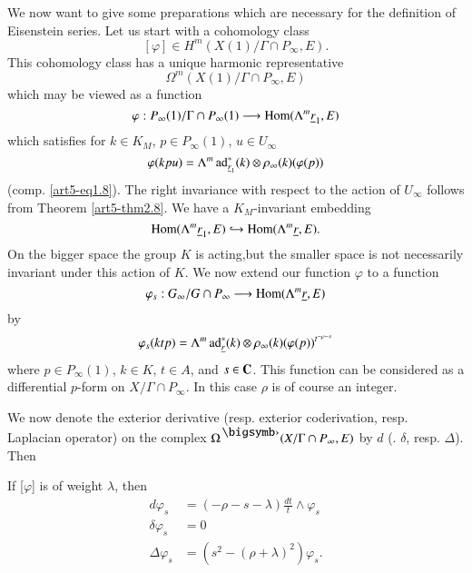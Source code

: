 We now want to give some preparations which are necessary for the definition of Eisenstein series. Let us start with a cohomology class
$$
[\varphi] \in H^m (X(1)/ \Gamma \cap P_\infty, E). 
$$
This cohomology class has a unique harmonic representative 
$$
\Omega^m (X(1) / \Gamma \cap P_\infty, E)
$$
 which may be viewed as a function
$$
\varphi : P_\infty (1)/ \Gamma \cap P_\infty (1) \longrightarrow \operatorname{Hom} (\Lambda^m \underline{r}_1, E)
$$
which satisfies for $k \in K_M$, $p \in P_\infty (1)$, $u \in U_\infty$
$$
\varphi (k p u) = \Lambda^m \operatorname{ad}^\ast_{\underline{r}_1} (k) \otimes \rho_\infty (k) (\varphi (p))
$$
(comp. \eqref{art5-eq1.8}). The right invariance with respect to the action of $U_\infty$ follows from Theorem \eqref{art5-thm2.8}. We have a $K_M$-invariant embedding 
$$
\operatorname{Hom} (\Lambda^m \underline{r}_1, E) \hookrightarrow \operatorname{Hom} (\Lambda^m\underline{r}, E).
$$
On the bigger space the group $K$ is acting,\pageoriginale but the smaller space is not necessarily invariant under this action of $K$. We now extend our function $\varphi$ to a function
$$
\varphi_s : G_\infty / G \cap P_\infty \longrightarrow \operatorname{Hom} (\Lambda^m\underline{r}, E)
$$
by
$$
\varphi_s (ktp) = \Lambda^m \operatorname{ad}^\ast_{\underline{r}} (k) \otimes \rho_\infty  (k) (\varphi (p))^{t^{-\rho -s}}
$$
where $p \in P_{\infty} (1)$, $k \in K$, $t \in A$, and $s \in \mathbf{C}$. This function can be considered as a differential $p$-form on $X/ \Gamma  \cap P_\infty$. In this case $\rho$ is of course an integer.

We now denote the exterior derivative (resp. exterior coderivation, resp. Laplacian operator) on the complex $\Omega^\bigdot (X/ \Gamma \cap P_\infty, E)$ by $d$ (\resp. $\delta$, resp. $\Delta$). Then 

\setcounter{equation}{0}
\begin{lemma}\label{art5-lem3.1}
If [$\varphi$] is of weight $\lambda$, then 
\begin{align*}
d \varphi_s & = (- \rho - s - \lambda) \frac{dt}{t} \wedge \varphi_s \\
\delta \varphi_s & = 0 \\
\Delta \varphi_s & = (s^2 - (\rho + \lambda)^2)\varphi_s.
\end{align*}
\end{lemma}

